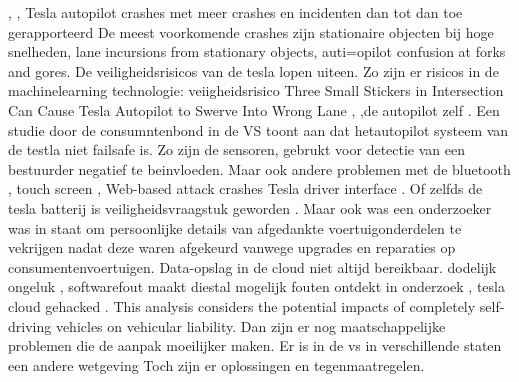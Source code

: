 \cite{stephardson18032021revieuwingtesla}
\cite{habib28062016NHTSATeslaReport},
\cite{darkReading17112020TeslaBackup},
\cite{heilweil26022020teslaAutopilot}
Tesla autopilot crashes met meer crashes en incidenten dan tot dan toe gerapporteerd
\cite{teslaFDSCrash}
De meest voorkomende crashes zijn stationaire objecten bij hoge snelheden, lane incursions from stationary objects, auti=opilot confusion at forks and gores.
\cite{teslaCrashesCauses}
\cite{teslacrashOvervieuw}
\cite{tesladeaths}
De veiligheidsrisicos van de tesla lopen uiteen. Zo zijn er risicos in de machinelearning technologie:
veiigheidsrisico Three Small Stickers in Intersection Can Cause Tesla Autopilot to Swerve Into Wrong Lane
\cite{evan01042019teslaautopilotIntersection},
\cite{lambert31062020q2safetyreport},de autopilot zelf
\cite{templeton06092019HTSBReportTesla}. Een studie door de consumntenbond in de VS toont aan dat hetautopilot systeem van de testla niet failsafe is. Zo zijn de sensoren, gebrukt voor detectie van een bestuurder negatief te beinvloeden.
\cite{dowling23042021autopilottricking} Maar ook andere problemen met de bluetooth 
\cite{wiredBloutoothHackTesla}, touch screen
\cite{preston14012021NHTSATeslaRecall},
Web-based attack crashes Tesla driver interface
\cite{leyden23032020TeslaInterfaceHack}.
Of zelfds de tesla batterij is veiligheidsvraagstuk geworden
\cite{mitchell01072020teslabatterycooling}.
Maar ook was een onderzoeker  was in staat om persoonlijke details van afgedankte voertuigonderdelen  te vekrijgen nadat deze waren afgekeurd vanwege upgrades en reparaties op consumentenvoertuigen.
\cite{stumpff04052020TeslaPersonalData}
Data-opslag in de cloud niet altijd bereikbaar.
\cite{mitchell24022020AIDataTesla}
dodelijk ongeluk
\cite{fottrell03092018TeslaSecurityChecks},
softwarefout maakt diestal mogelijk
\cite{kirk26112020modelX}
fouten ontdekt in onderzoek
\cite{bbc24022021hyundaiBatteryFireFix},
tesla cloud gehacked
\cite{hawkins22102022}.
This analysis considers the potential impacts of completely self-driving vehicles on vehicular liability. 
\cite{griemannExaminSelfDriving}
Dan zijn er nog maatschappelijke problemen die de aanpak moeilijker maken.
Er is in de vs in verschillende staten een andere wetgeving
\cite{berry21042021teslacrashtexas}
\cite{hull23072021regulatorsaftercrash}
\cite{wikiTeslaAutopilot}
Toch zijn er oplossingen en tegenmaatregelen.
